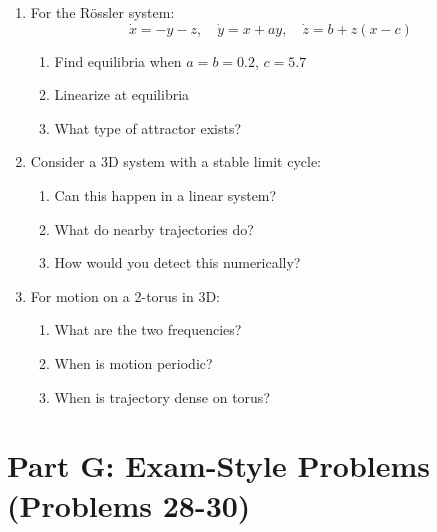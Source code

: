 \documentclass[12pt]{article}
\begin{document}
\begin{enumerate}[resume]
\item For the Rössler system:
$$\dot{x} = -y - z, \quad \dot{y} = x + ay, \quad \dot{z} = b + z(x - c)$$
\begin{enumerate}[label=(\alph*)]
    \item Find equilibria when $a = b = 0.2$, $c = 5.7$
    \item Linearize at equilibria
    \item What type of attractor exists?
\end{enumerate}

\item Consider a 3D system with a stable limit cycle:
\begin{enumerate}[label=(\alph*)]
    \item Can this happen in a linear system?
    \item What do nearby trajectories do?
    \item How would you detect this numerically?
\end{enumerate}

\item For motion on a 2-torus in 3D:
\begin{enumerate}[label=(\alph*)]
    \item What are the two frequencies?
    \item When is motion periodic?
    \item When is trajectory dense on torus?
\end{enumerate}
\end{enumerate}

\section*{Part G: Exam-Style Problems (Problems 28-30)}
\end{document}
